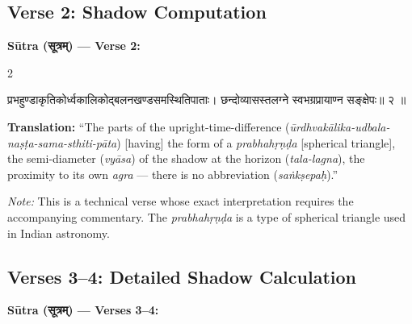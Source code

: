 \documentclass[11pt,a4paper]{article}
\newcommand{\dev}[1]{{\devanagarifont #1}}
\newenvironment{sanskritverse}{%
  \begin{center}\begin{minipage}{0.95\textwidth}
  \setlength{\leftskip}{1em}
  \setlength{\rightskip}{1em}
  \dev
}{\end{minipage}\end{center}}
\begin{document}
\subsection{Verse 2: Shadow Computation}

\vspace{0.5em}
\noindent\textbf{Sūtra (\dev{सूत्रम्}) — Verse 2:}

\begin{paracol}{2}

\begin{sanskritverse}
प्रभहुण्डाकृतिकोर्ध्वकालिकोद्बलनखण्डसमस्थितिपाताः।
छन्दोव्यासस्तलग्ने स्वभग्रप्रायाण्न सङ्क्षेपः॥ २ ॥
\end{sanskritverse}

\switchcolumn

\textbf{Translation:} ``The parts of the upright-time-difference (\textit{ūrdhvakālika-udbala-naṣṭa-sama-sthiti-pāta}) [having] the form of a \textit{prabhahṛṇḍa} [spherical triangle], the semi-diameter (\textit{vyāsa}) of the shadow at the horizon (\textit{tala-lagna}), the proximity to its own \textit{agra} --- there is no abbreviation (\textit{saṅkṣepaḥ}).''

\textit{Note:} This is a technical verse whose exact interpretation requires the accompanying commentary. The \textit{prabhahṛṇḍa} is a type of spherical triangle used in Indian astronomy.

\end{paracol}

\subsection{Verses 3--4: Detailed Shadow Calculation}

\vspace{0.5em}
\noindent\textbf{Sūtra (\dev{सूत्रम्}) — Verses 3--4:}
\end{document}
